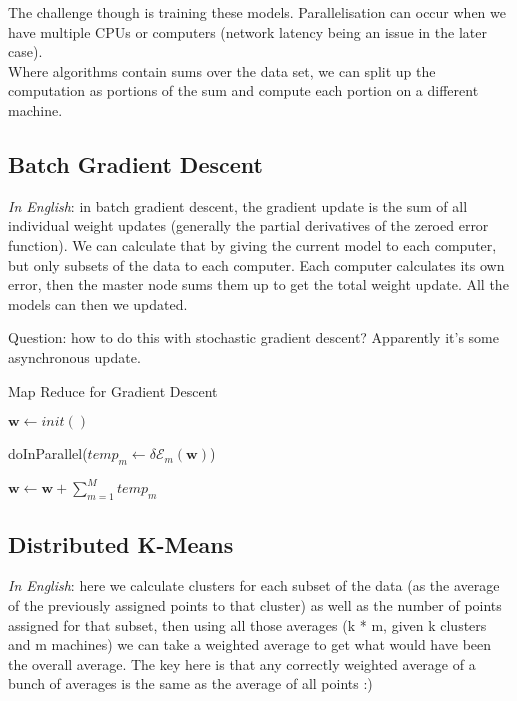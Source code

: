 \documentclass[a4paper]{article}
\begin{document}
	The challenge though is training these models. Parallelisation can occur when we have multiple CPUs or computers (network latency being an issue in the later case). \\
	
	Where algorithms contain sums over the data set, we can split up the computation as portions of the sum and compute each portion on a different machine. \\
	
	\subsection{Batch Gradient Descent}
	
	\textit{In English}: in batch gradient descent, the gradient update is the sum of all individual weight updates (generally the partial derivatives of the zeroed error function). We can calculate that by giving the current model to each computer, but only subsets of the data to each computer. Each computer calculates its own error, then the master node sums them up to get the total weight update. All the models can then we updated. 
	
	Question: how to do this with stochastic gradient descent? Apparently it's some asynchronous update.
	
	\begin{algorithm}
		\caption{Map Reduce for Gradient Descent}
			\begin{algorithmic}[5]
				  
				
				\State $\mathbf{w} \gets init()$ 
				
					
					\State doInParallel($temp_m \gets \delta \mathcal{E}_m(\mathbf{w})$)
					
					\State $\mathbf{w} \gets \mathbf{w} + \sum_{m=1}^M temp_m$
				
				\EndWhile
				
				\EndProcedure
			\end{algorithmic}
		\end{algorithm}
		
	
	\subsection{Distributed K-Means}
	
	\textit{In English}: here we calculate clusters for each subset of the data (as the average of the previously assigned points to that cluster) as well as the number of points assigned for that subset, then using all those averages (k * m, given k clusters and m machines) we can take a weighted average to get what would have been the overall average. The key here is that any correctly weighted average of a bunch of averages is the same as the average of all points :)
	
\end{document}
